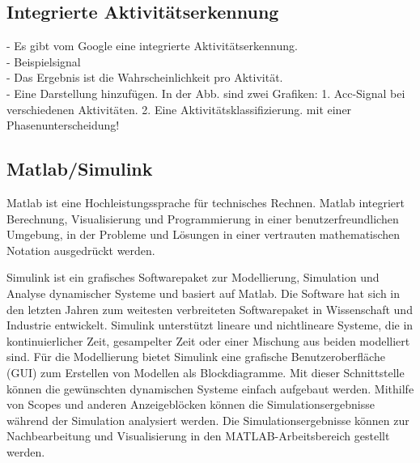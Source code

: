 %
%
%
%

\subsection{Integrierte Aktivitätserkennung}

- Es gibt vom Google eine integrierte Aktivitätserkennung.\\

- Beispielsignal\\

- Das Ergebnis ist die Wahrscheinlichkeit pro Aktivität.\\

- Eine Darstellung hinzufügen. In der Abb. sind zwei Grafiken: 1. Acc-Signal bei verschiedenen Aktivitäten. 2. Eine Aktivitätsklassifizierung. mit einer Phasenunterscheidung!

\subsection{Matlab/Simulink}

Matlab ist eine Hochleistungssprache für technisches Rechnen. Matlab integriert Berechnung, Visualisierung und Programmierung in einer benutzerfreundlichen Umgebung, in der Probleme und Lösungen in einer vertrauten mathematischen Notation ausgedrückt werden.

Simulink ist ein grafisches Softwarepaket zur Modellierung, Simulation und Analyse dynamischer Systeme und basiert auf Matlab. 
Die Software hat sich in den letzten Jahren zum weitesten verbreiteten Softwarepaket in Wissenschaft und Industrie entwickelt.
Simulink unterstützt lineare und nichtlineare Systeme, die in kontinuierlicher Zeit, gesampelter Zeit oder einer Mischung aus beiden modelliert sind. Für die Modellierung bietet Simulink eine grafische Benutzeroberfläche (GUI) zum Erstellen von Modellen als Blockdiagramme. Mit dieser Schnittstelle können die gewünschten dynamischen Systeme einfach aufgebaut werden. Mithilfe von Scopes und anderen Anzeigeblöcken können die Simulationsergebnisse während der Simulation analysiert werden. Die Simulationsergebnisse können zur Nachbearbeitung und Visualisierung in den MATLAB-Arbeitsbereich gestellt werden. \citep{Iov2004}\citep{Karris2008}\\



